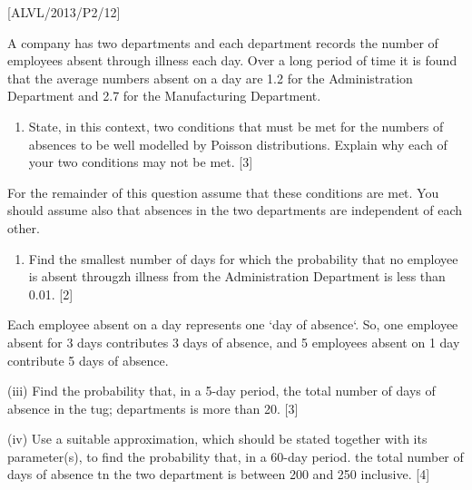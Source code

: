 \item {[}ALVL/2013/P2/12{]}

A company has two departments and each department records the number
of employees absent through illness each day. Over a long period of
time it is found that the average numbers absent on a day are 1.2
for the Administration Department and 2.7 for the Manufacturing Department.
\begin{enumerate}
\item State, in this context, two conditions that must be met for the numbers
of absences to be well modelled by Poisson distributions. Explain
why each of your two conditions may not be met. \hfill{}{[}3{]}
\end{enumerate}
For the remainder of this question assume that these conditions are
met. You should assume also that absences in the two departments are
independent of each other.
\begin{enumerate}
\item Find the smallest number of days for which the probability that no
employee is absent througzh illness from the Administration Department
is less than 0.01. \hfill{}{[}2{]}
\end{enumerate}
Each employee absent on a day represents one \textquoteleft day of
absence\textquoteleft . So, one employee absent for 3 days contributes
3 days of absence, and 5 employees absent on 1 day contribute 5 days
of absence.

(iii) Find the probability that, in a 5-day period, the total number
of days of absence in the tug; departments is more than 20. \hfill{}
{[}3{]}

(iv) Use a suitable approximation, which should be stated together
with its parameter(s), to find the probability that, in a 60-day period.
the total number of days of absence tn the two department is between
200 and 250 inclusive. \hfill{}{[}4{]}
